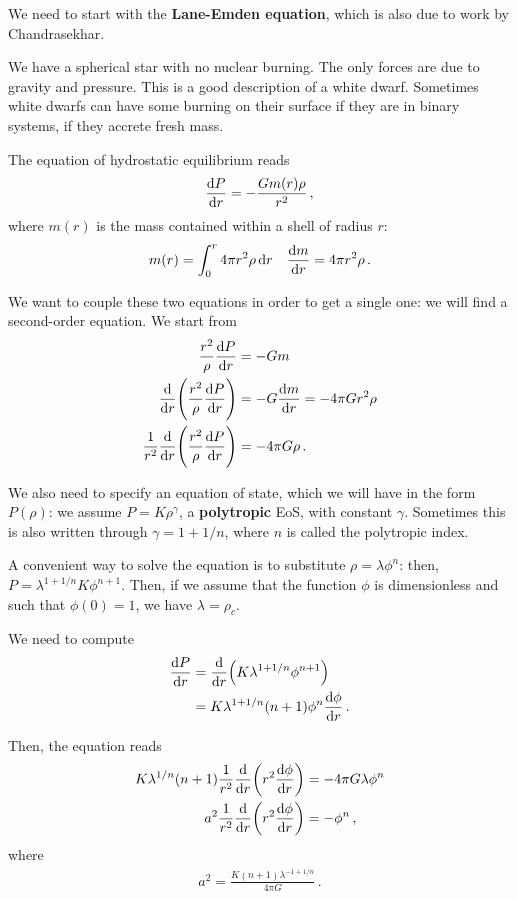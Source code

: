 \documentclass[main.tex]{subfiles}
\begin{document}
We need to start with the \textbf{Lane-Emden equation}, which is also due to work by Chandrasekhar. 

We have a spherical star with no nuclear burning. 
The only forces are due to gravity and pressure. This is a good description of a white dwarf. 
Sometimes white dwarfs can have some burning on their surface if they are in binary systems, if they accrete fresh mass. 

The equation of hydrostatic equilibrium reads 
%
\begin{align}
\dv{P}{r} = - \frac{G m(r) \rho }{r^2}
\,,
\end{align}
%
where \(m(r)\) is the mass contained within a shell of radius \(r\):
%
\begin{align}
m(r) = \int_0^{r} 4 \pi r^2 \rho \dd{r} 
&& 
\dv{m}{r} = 4 \pi r^2 \rho 
\,.
\end{align}

We want to couple these two equations in order to get a single one: we will find a second-order equation. 
We start from 
%
\begin{align}
\frac{r^2}{\rho }\dv{P}{r} &= - G m  \\
\dv{}{r} \qty(\frac{r^2}{\rho }\dv{P}{r}) &=
- G \dv{m}{r} = - 4 \pi G r^2 \rho  \\
\frac{1}{r^2} \dv{}{r} \qty( \frac{r^2}{\rho } \dv{P}{r}) &= - 4 \pi G \rho 
\,.
\end{align}

We also need to specify an equation of state, which we will have in the form \(P(\rho )\): we assume \(P = K \rho^{\gamma }\), a \textbf{polytropic} EoS, with constant \(\gamma \).
Sometimes this is also written through \(\gamma = 1 + 1/n\), where \(n\) is called the polytropic index. 

A convenient way to solve the equation is to substitute \(\rho = \lambda \phi^{n}\): then, \(P = \lambda^{1+1/n} K \phi^{n+1}\). 
Then, if we assume that the function \(\phi \) is dimensionless and such that \(\phi (0) = 1\), we have \(\lambda = \rho _c\). 

We need to compute 
%
\begin{align}
\dv{P}{r} &= \dv{}{r} \qty( K \lambda^{1 + 1/n} \phi^{n+1})  \\
&= K \lambda^{1 + 1/n} (n+1) \phi^{n} \dv{\phi }{r} 
\,.
\end{align}

Then, the equation reads 
%
\begin{align}
K \lambda^{1/n} (n+1) \frac{1}{r^2} \dv{}{r} \qty(r^2 \dv{\phi }{r} )
&= - 4 \pi G \lambda \phi^{n}  \\
a^2 \frac{1}{r^2} \dv{}{r} \qty(r^2 \dv{\phi }{r}) &= - \phi^{n} 
\,,
\end{align}
%
where 
%
\begin{align}
a^2 = \frac{K (n+1) \lambda^{-1 + 1/n}}{4 \pi G}
\,.
\end{align}
\end{document}
